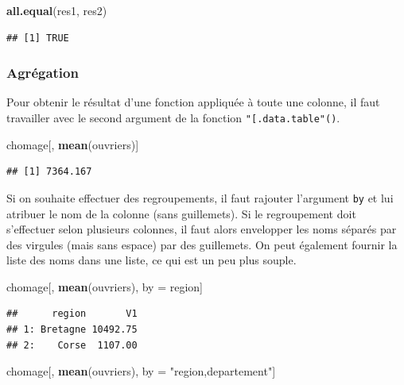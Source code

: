 \documentclass[
  11pt,
]{book}
\newenvironment{Shaded}{\begin{snugshade}}{\end{snugshade}}
\newcommand{\KeywordTok}[1]{\textcolor[rgb]{0.13,0.29,0.53}{\textbf{#1}}}
\newcommand{\NormalTok}[1]{#1}
\newcommand{\StringTok}[1]{\textcolor[rgb]{0.31,0.60,0.02}{#1}}
\numberwithin{equation}{section}
\numberwithin{countremarque}{section}
\begin{document}
\begin{Shaded}
\begin{Highlighting}[]
\KeywordTok{all.equal}\NormalTok{(res1, res2)}
\end{Highlighting}
\end{Shaded}

\begin{lstlisting}
## [1] TRUE
\end{lstlisting}

\hypertarget{agruxe9gation-1}{%
\subsubsection{Agrégation}\label{agruxe9gation-1}}

Pour obtenir le résultat d'une fonction appliquée à toute une colonne, il faut travailler avec le second argument de la fonction \texttt{"{[}.data.table"()}.

\begin{Shaded}
\begin{Highlighting}[]
\NormalTok{chomage[, }\KeywordTok{mean}\NormalTok{(ouvriers)]}
\end{Highlighting}
\end{Shaded}

\begin{lstlisting}
## [1] 7364.167
\end{lstlisting}

Si on souhaite effectuer des regroupements, il faut rajouter l'argument \texttt{by} et lui atribuer le nom de la colonne (sans guillemets). Si le regroupement doit s'effectuer selon plusieurs colonnes, il faut alors envelopper les noms séparés par des virgules (mais sans espace) par des guillemets. On peut également fournir la liste des noms dans une liste, ce qui est un peu plus souple.

\begin{Shaded}
\begin{Highlighting}[]
\NormalTok{chomage[, }\KeywordTok{mean}\NormalTok{(ouvriers), by =}\StringTok{ }\NormalTok{region]}
\end{Highlighting}
\end{Shaded}

\begin{lstlisting}
##      region       V1
## 1: Bretagne 10492.75
## 2:    Corse  1107.00
\end{lstlisting}

\begin{Shaded}
\begin{Highlighting}[]
\NormalTok{chomage[, }\KeywordTok{mean}\NormalTok{(ouvriers), by =}\StringTok{ "region,departement"}\NormalTok{]}
\end{Highlighting}
\end{Shaded}
\end{document}
